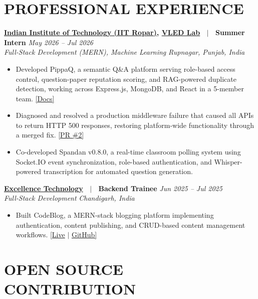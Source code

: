 \documentclass[10.5pt,letterpaper]{article}
\begin{document}
\section*{PROFESSIONAL EXPERIENCE}

\textbf{\href{https://www.iitrpr.ac.in/}{Indian Institute of Technology (IIT Ropar)}, \href{https://vled.iitrpr.ac.in/}{VLED Lab} \ $|$ \ Summer Intern} \hfill \textit{May 2026 -- Jul 2026}\\
\textit{Full-Stack Development (MERN), Machine Learning} \hfill \textit{Rupnagar, Punjab, India}
\begin{itemize}
  \item Developed PippaQ, a semantic Q\&A platform serving role-based access control, question-paper reputation scoring, and RAG-powered duplicate detection, working across Express.js, MongoDB, and React in a 5-member team. \href{https://drive.google.com/file/d/1RU8wq0uf07ByLVOdb_mGwBCbujkNM8WS/view?usp=drivesdk}{[Docs]}
  \item Diagnosed and resolved a production middleware failure that caused all APIs to return HTTP 500 responses, restoring platform-wide functionality through a merged fix. \href{https://github.com/abhi03241/FAQ/pull/2}{[PR \#2]}
  \item Co-developed Spandan v0.8.0, a real-time classroom polling system using Socket.IO event synchronization, role-based authentication, and Whisper-powered transcription for automated question generation.
\end{itemize}

\textbf{\href{https://www.excellencetechnology.in/}{Excellence Technology} \ $|$ \ Backend Trainee} \hfill \textit{Jun 2025 -- Jul 2025}\\
\textit{Full-Stack Development} \hfill \textit{Chandigarh, India}
\begin{itemize}
  \item Built CodeBlog, a MERN-stack blogging platform implementing authentication, content publishing, and CRUD-based content management workflows. \href{https://thecodeblog.vercel.app/}{[Live} $|$ \href{https://github.com/amankr32/TheCodeBlog}{GitHub]}
\end{itemize}

\section*{OPEN SOURCE CONTRIBUTION}
\end{document}
